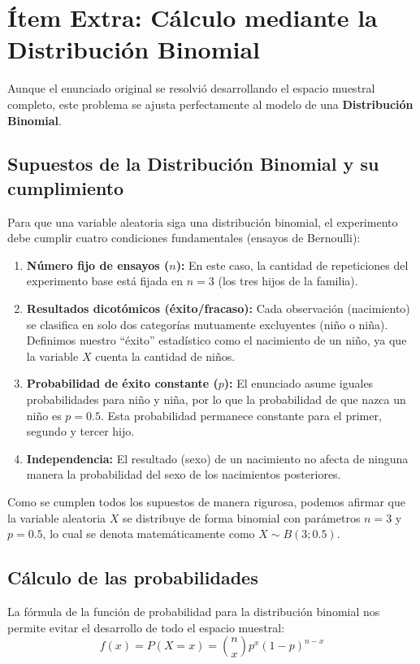 \documentclass[11pt, a4paper]{article}
\begin{document}
\section*{Ítem Extra: Cálculo mediante la Distribución Binomial}

Aunque el enunciado original se resolvió desarrollando el espacio muestral completo, este problema se ajusta perfectamente al modelo de una \textbf{Distribución Binomial}. 

\subsection*{Supuestos de la Distribución Binomial y su cumplimiento}
Para que una variable aleatoria siga una distribución binomial, el experimento debe cumplir cuatro condiciones fundamentales (ensayos de Bernoulli):
\begin{enumerate}
    \item \textbf{Número fijo de ensayos ($n$):} En este caso, la cantidad de repeticiones del experimento base está fijada en $n = 3$ (los tres hijos de la familia).
    \item \textbf{Resultados dicotómicos (éxito/fracaso):} Cada observación (nacimiento) se clasifica en solo dos categorías mutuamente excluyentes (niño o niña). Definimos nuestro ``éxito'' estadístico como el nacimiento de un niño, ya que la variable $X$ cuenta la cantidad de niños.
    \item \textbf{Probabilidad de éxito constante ($p$):} El enunciado asume iguales probabilidades para niño y niña, por lo que la probabilidad de que nazca un niño es $p = 0.5$. Esta probabilidad permanece constante para el primer, segundo y tercer hijo.
    \item \textbf{Independencia:} El resultado (sexo) de un nacimiento no afecta de ninguna manera la probabilidad del sexo de los nacimientos posteriores.
\end{enumerate}

Como se cumplen todos los supuestos de manera rigurosa, podemos afirmar que la variable aleatoria $X$ se distribuye de forma binomial con parámetros $n=3$ y $p=0.5$, lo cual se denota matemáticamente como $X \sim B(3; 0.5)$.

\subsection*{Cálculo de las probabilidades}
La fórmula de la función de probabilidad para la distribución binomial nos permite evitar el desarrollo de todo el espacio muestral:
\[ f(x) = P(X=x) = \binom{n}{x} p^x (1-p)^{n-x} \]
\end{document}
